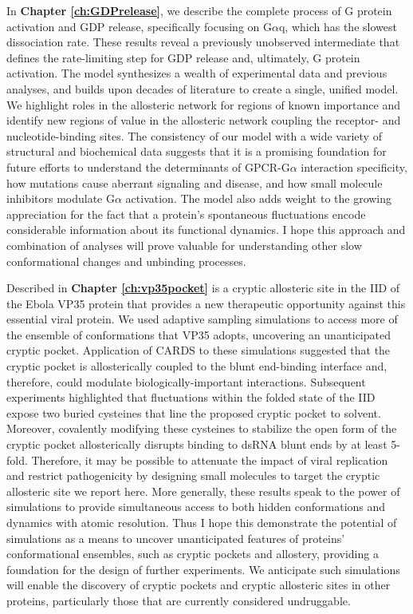 \documentclass[../main.tex]{subfiles}
\begin{document}
        In \textbf{Chapter \ref{ch:GDPrelease}}, we describe the complete process of G protein activation and GDP release, specifically focusing on G$\alpha$q, which has the slowest dissociation rate. These results reveal a previously unobserved intermediate that defines the rate-limiting step for GDP release and, ultimately, G protein activation. The model synthesizes a wealth of experimental data and previous analyses, and builds upon decades of literature to create a single, unified model. We highlight roles in the allosteric network for regions of known importance and identify new regions of value in the allosteric network coupling the receptor- and nucleotide-binding sites. The consistency of our model with a wide variety of structural and biochemical data suggests that it is a promising foundation for future efforts to understand the determinants of GPCR-G$\alpha$ interaction specificity, how mutations cause aberrant signaling and disease, and how small molecule inhibitors modulate G$\alpha$ activation. The model also adds weight to the growing appreciation for the fact that a protein’s spontaneous fluctuations encode considerable information about its functional dynamics.  I hope this approach and combination of analyses will prove valuable for understanding other slow conformational changes and unbinding processes.

        Described in \textbf{Chapter \ref{ch:vp35pocket}} is a cryptic allosteric site in the IID of the Ebola VP35 protein that provides a new therapeutic opportunity against this essential viral protein. We used adaptive sampling simulations to access more of the ensemble of conformations that VP35 adopts, uncovering an unanticipated cryptic pocket. Application of CARDS to these simulations suggested that the cryptic pocket is allosterically coupled to the blunt end-binding interface and, therefore, could modulate biologically-important interactions. Subsequent experiments highlighted that fluctuations within the folded state of the IID expose two buried cysteines that line the proposed cryptic pocket to solvent. Moreover, covalently modifying these cysteines to stabilize the open form of the cryptic pocket allosterically disrupts binding to dsRNA blunt ends by at least 5-fold. Therefore, it may be possible to attenuate the impact of viral replication and restrict pathogenicity by designing small molecules to target the cryptic allosteric site we report here. More generally, these results speak to the power of simulations to provide simultaneous access to both hidden conformations and dynamics with atomic resolution. Thus I hope this demonstrate the potential of simulations as a means to uncover unanticipated features of proteins’ conformational ensembles, such as cryptic pockets and allostery, providing a foundation for the design of further experiments. We anticipate such simulations will enable the discovery of cryptic pockets and cryptic allosteric sites in other proteins, particularly those that are currently considered undruggable.
\end{document}
